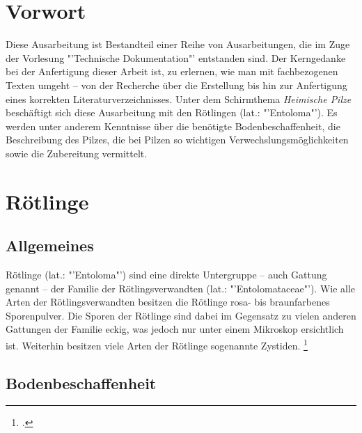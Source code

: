 \documentclass[a4paper,abstracton]{scrreprt}
\begin{document}


\tableofcontents

\begin{abstract}
\begin{quote}%
Diese Arbeit befasst sich mit Pizlen und so nem kram. kein scheiss
\end{quote} 
\end{abstract}

\chapter{Vorwort}
Diese Ausarbeitung ist Bestandteil einer Reihe von Ausarbeitungen, die im Zuge der Vorlesung "'Technische Dokumentation"' entstanden sind. Der Kerngedanke bei der Anfertigung dieser Arbeit ist, zu erlernen, wie man mit fachbezogenen Texten umgeht -- von der Recherche über die Erstellung bis hin zur Anfertigung eines korrekten Literaturverzeichnisses. Unter dem Schirmthema \emph{Heimische Pilze} beschäftigt sich diese Ausarbeitung mit den Rötlingen (lat.: "'Entoloma"'). Es werden unter anderem Kenntnisse über die benötigte Bodenbeschaffenheit, die Beschreibung des Pilzes, die bei Pilzen so wichtigen Verwechslungsmöglichkeiten sowie die Zubereitung vermittelt.
\chapter{Rötlinge}
\section{Allgemeines}
Rötlinge (lat.: "'Entoloma"') sind eine direkte Untergruppe -- auch Gattung genannt -- der Familie der Rötlingsverwandten (lat.: "'Entolomataceae"'). Wie alle Arten der Rötlingsverwandten besitzen die Rötlinge rosa- bis braunfarbenes Sporenpulver. Die Sporen der Rötlinge sind dabei im Gegensatz zu vielen anderen Gattungen der Familie eckig, was jedoch nur unter einem Mikroskop ersichtlich ist. Weiterhin besitzen viele Arten der Rötlinge sogenannte Zystiden. 
\footcite{entoloma}
\section{Bodenbeschaffenheit}
\end{document}

